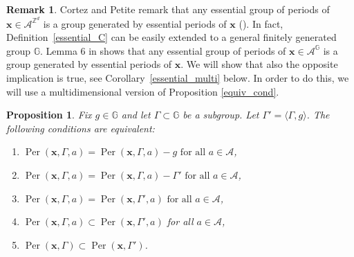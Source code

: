 \documentclass[leqno,a4paper,12pt]{article}
\newtheorem{Prop}[Th]{Proposition}
\theoremstyle{definition}
\newtheorem{Remark}[Th]{Remark}
\newcommand{\Per}{\operatorname{Per}\nolimits}
\newcommand{\Z}{{\mathbb{Z}}}
\newcommand{\G}{\mathbb{G}}
\begin{document}
\begin{Remark}\label{No1}
Cortez and Petite remark that any essential group of periods of $\bm{x}\in\mathcal{A}^{\Z^d}$ is a group generated by essential periods of $\bm{x}$ (\cite[Remark 2]{MR2427048}). In fact, Definition~\ref{essential_C} can be easily extended to a general finitely generated group $\G$. Lemma 6 in \cite{MR2427048} shows that any essential group of periods of $\bm{x}\in\mathcal{A}^\G$ is a group generated by essential periods of $\bm{x}$. We will show that also the opposite implication is true, see Corollary~\ref{essential_multi} below. In order to do this, we will use a multidimensional version of Proposition \ref{equiv_cond}.
\end{Remark}
\begin{Prop}\label{multi_equiv_cond}
Fix $g\in\G$ and let $\Gamma\subset\G$ be a subgroup. Let $\Gamma'=\langle\Gamma,g\rangle$. The following conditions are equivalent:
\begin{enumerate}
\item[(a)]
$\Per(\bm{x},\Gamma,a)=\Per(\bm{x},\Gamma,a)-g \text{ for all }a\in\mathcal{A}$,
\item[(b)]
$\Per(\bm{x},\Gamma,a)=\Per(\bm{x},\Gamma,a)-\Gamma' \text{ for all }a\in\mathcal{A}$,
\item[(c)]
$\Per(\bm{x},\Gamma,a)=\Per(\bm{x},\Gamma',a)\text{ for all }a\in \mathcal{A}$,
\item[(d)]
$\Per(\bm{x},\Gamma,a)\subset \Per(\bm{x},\Gamma',a)$ for all $a\in \mathcal{A}$,
\item[(e)]
$\Per(\bm{x},\Gamma)\subset \Per(\bm{x},\Gamma')$.
\end{enumerate}
\end{Prop}
\end{document}
